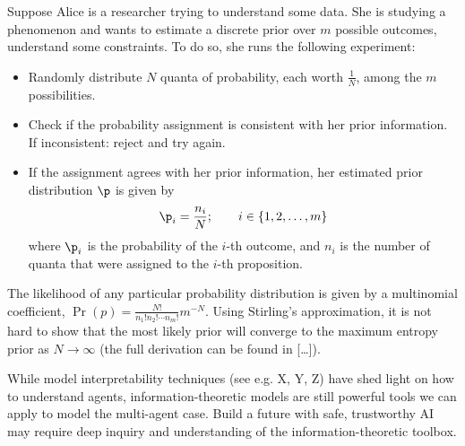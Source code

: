\documentclass[11pt]{article}
\begin{document}
Suppose Alice is a researcher trying to understand some data.  She is studying a phenomenon and wants to estimate a discrete prior over $m$ possible outcomes, understand some constraints.  To do so, she runs the following experiment:
\begin{itemize}
  \item Randomly distribute $N$ quanta of probability, each worth $\frac{1}{N}$, among the $m$ possibilities.
  \item Check if the probability assignment is consistent with her prior information.  If inconsistent: reject and try again.
  \item If the assignment agrees with her prior information, her estimated prior distribution $\p$ is given by
    \begin{align*}
      \p_i = \frac{n_i}{N}; \qquad i \in \left\{ 1, 2, \dots, m \right\}
    \end{align*}
    where $\p_i$ is the probability of the $i$-th outcome, and $n_i$ is the number of quanta that were assigned to the $i$-th proposition.
\end{itemize}
The likelihood of any particular probability distribution is given by a multinomial coefficient, $\Pr(p) = \frac{N!}{n_1! n_2! \cdots n_m!} m^{-N}$.  Using Stirling's approximation, it is not hard to show that the most likely prior will converge to the maximum entropy prior as $N \to \infty$ (the full derivation can be found in [\dots]).

While model interpretability techniques (see e.g. X, Y, Z) have shed light on how to understand agents, information-theoretic models are still powerful tools we can apply to model the multi-agent case.  Build a future with safe, trustworthy AI may require deep inquiry and understanding of the information-theoretic toolbox.


\nocite{*}

\end{document}
